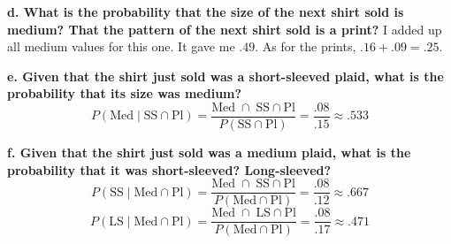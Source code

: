 \textbf{d. What is the probability that the size of the next shirt sold is medium? That the pattern of the next shirt sold is a print?} \newline
I added up all medium values for this one. It gave me $\boxed{.49}$. \newline 
As for the prints, $.16 + .09 = \boxed{.25}$.

\textbf{e. Given that the shirt just sold was a short-sleeved plaid, what is the probability that its size was medium? } 
\[P( \text{Med} \; | \; \text{SS} \cap \text{Pl} ) = \frac{\text{Med} \; \cap \; \text{SS} \cap \text{Pl}}{P( \text{SS} \cap \text{Pl})} = \frac{.08}{.15} \approx \boxed{.533}\]

\textbf{f. Given that the shirt just sold was a medium plaid, what is the probability that it was short-sleeved? Long-sleeved?} 
\[P( \text{SS} \; | \; \text{Med} \cap \text{Pl} ) = \frac{\text{Med} \; \cap \; \text{SS} \cap \text{Pl}}{P( \text{Med} \cap \text{Pl})} = \frac{.08}{.12} \approx \boxed{.667}\]
\[P( \text{LS} \; | \; \text{Med} \cap \text{Pl} ) = \frac{\text{Med} \; \cap \; \text{LS} \cap \text{Pl}}{P( \text{Med} \cap \text{Pl})} = \frac{.08}{.17} \approx \boxed{.471}\]